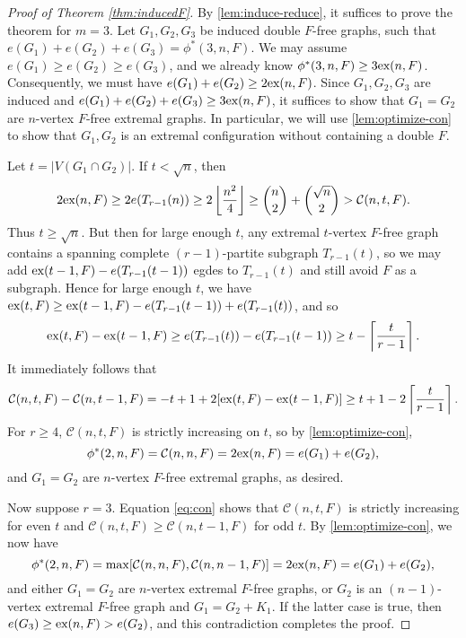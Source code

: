 \documentclass[12pt]{article}
\newcommand*{\ex}{\textnormal{ex}}
\newcommand*{\con}{\mathcal{C}}
\begin{document}
\begin{proof}[Proof of Theorem \ref{thm:inducedF}]
  By \cref{lem:induce-reduce}, it suffices to prove the theorem for $m = 3$. Let $G_1, G_2, G_3$ be induced double $F$-free graphs, such that $e(G_1) + e(G_2) + e(G_3) = \phi^*(3, n, F)$. We may assume $e(G_1) \geq e(G_2) \geq e(G_3)$, and we already know $\phi^*(3, n, F) \geq 3\ex(n, F)$. Consequently, we must have $e(G_1) + e(G_2) \geq 2\ex(n, F)$. Since $G_1, G_2, G_3$ are induced and $e(G_1) + e(G_2) + e(G_3) \geq 3\ex(n, F)$, it suffices to show that $G_1 = G_2$ are $n$-vertex $F$-free extremal graphs. In particular, we will use \cref{lem:optimize-con} to show that $G_1, G_2$ is an extremal configuration without containing a double $F$.
  
  Let $t = |V(G_1 \cap G_2)|$. If $t < \sqrt{n}$, then
  \[
    2\ex(n, F) \geq 2e(T_{r - 1}(n)) \geq 2\left\lfloor\frac{n^2}{4}\right\rfloor \geq \binom{n}{2} + \binom{\sqrt{n}}{2} > \con(n, t, F).
  \]
  Thus $t \geq \sqrt{n}$. But then for large enough $t$, any extremal $t$-vertex $F$-free graph contains a spanning complete $(r - 1)$-partite subgraph $T_{r - 1}(t)$, so we may add $\ex(t - 1, F) - e(T_{r - 1}(t - 1))$ egdes to $T_{r - 1}(t)$ and still avoid $F$ as a subgraph. Hence for large enough $t$, we have $\ex(t, F) \geq \ex(t - 1, F) - e(T_{r - 1}(t - 1)) + e(T_{r - 1}(t))$, and so
  \[
    \ex(t, F) - \ex(t - 1, F) \geq e(T_{r - 1}(t)) - e(T_{r - 1}(t - 1)) \geq t - \left\lceil \frac{t}{r - 1} \right\rceil.
  \]
  It immediately follows that
  \begin{equation}
    \con(n, t, F) - \con(n, t - 1, F) = - t + 1 + 2[\ex(t, F) - \ex(t - 1, F)] \geq t + 1 - 2\left\lceil \frac{t}{r - 1} \right\rceil. \label{eq:con}
  \end{equation}
  For $r \geq 4$, $\con(n, t, F)$ is strictly increasing on $t$, so by \cref{lem:optimize-con}, 
  \[
    \phi^*(2, n, F) = \con(n, n, F) = 2\ex(n, F) = e(G_1) + e(G_2),
  \] 
  and $G_1 = G_2$ are $n$-vertex $F$-free extremal graphs, as desired. 
  
  Now suppose $r = 3$. Equation \eqref{eq:con} shows that $\con(n, t, F)$ is strictly increasing for even $t$ and $\con(n, t, F) \geq \con(n, t - 1, F)$ for odd $t$. By \cref{lem:optimize-con}, we now have 
  \[
    \phi^*(2, n, F) = \max[\con(n, n, F), \con(n, n - 1, F)] = 2\ex(n, F) = e(G_1) + e(G_2),
  \]
  and either $G_1 = G_2$ are $n$-vertex extremal $F$-free graphs, or $G_2$ is an $(n - 1)$-vertex extremal $F$-free graph and $G_1 = G_2 + K_1$. If the latter case is true, then $e(G_3) \geq \ex(n, F) > e(G_2)$, and this contradiction completes the proof.
\end{proof}
\end{document}

